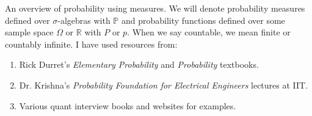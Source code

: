 An overview of probability using measures. We will denote probability measures defined over $\sigma$-algebras with $\mathbb{P}$ and probability functions defined over some sample space $\Omega$ or $\mathbb{R}$ with $P$ or $p$. When we say countable, we mean finite or countably infinite. I have used resources from: 
\begin{enumerate}
  \item Rick Durret's \textit{Elementary Probability} and \textit{Probability} textbooks. 
  \item Dr. Krishna's \textit{Probability Foundation for Electrical Engineers} lectures at IIT. 
  \item Various quant interview books and websites for examples. 
\end{enumerate}

